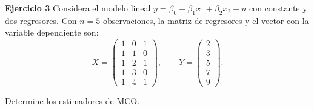 \documentclass[11pt]{article}
\begin{document}
{\bf Ejercicio 3}
Considera el modelo lineal \(y=\beta_0+\beta_1 x_1+\beta_2 x_2+u\) con constante y dos regresores. 
Con \(n=5\) observaciones, la matriz de regresores y el vector con la variable dependiente son:
\[
X=\begin{pmatrix}
1&0&1\\
1&1&0\\
1&2&1\\
1&3&0\\
1&4&1
\end{pmatrix},\qquad
Y=\begin{pmatrix}2\\3\\5\\7\\9\end{pmatrix}.
\]

Determine los estimadores de MCO.
\end{document}
